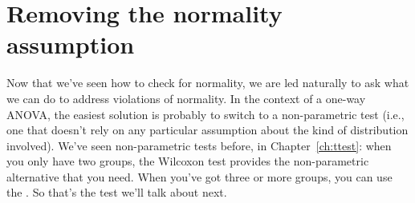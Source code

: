 \section{Removing the normality assumption~\label{sec:kruskalwallis}}

Now that we've seen how to check for normality, we are led naturally to ask what we can do to address violations of normality. In the context of a one-way ANOVA, the easiest solution is probably to switch to a non-parametric test (i.e., one that doesn't rely on any particular assumption about the kind of distribution involved). We've seen non-parametric tests before, in Chapter~\ref{ch:ttest}: when you only have two groups, the Wilcoxon test provides the non-parametric alternative that you need. When you've got three or more groups, you can use the  \cite{KruskalWallis1952}. So that's the test we'll talk about next.


